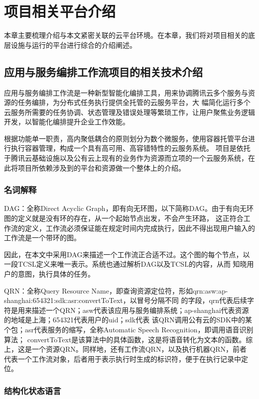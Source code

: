 
\chapter{项目相关平台介绍}
本章主要梳理介绍与本文紧密关联的云平台环境。在本章，我们将对项目相关的底层设施与运行的平台进行综合的介绍阐述。
\cite{ipacfteaom1}
\section{应用与服务编排工作流项目的相关技术介绍}
应用与服务编排工作流是一种新型智能化编排工具，用来协调腾讯云多个服务与资源的任务编排，为分布式任务执行提供全托管的云服务平台，大
幅简化运行多个云服务所需要的任务协调、状态管理及错误处理等繁琐工作，让用户聚焦业务逻辑开发，以智能化编排提升企业工作效能\cite{jydyyybp}。

根据功能单一职责，高内聚低耦合的原则划分为数个微服务，使用容器托管平台进行执行容器管理，构成一个具有高可用、高容错特性的云服务系统。
项目是依托于腾讯云基础设施以及公有云上现有的业务作为资源而立项的一个云服务系统，在此将项目所依赖涉及到的平台和资源做一个整体上的介绍。


\subsection{名词解释}

DAG：全称Direct Acyclic Graph，即有向无环图，以下简称DAG。由于有向无环图的定义就是没有环的存在，从一个起始节点出发，不会产生环路，
这正符合工作流的定义，工作流必须保证能在规定时间内完成执行，因此不得出现用户输入的工作流是一个带环的图。

因此，在本文中采用DAG来描述一个工作流正合适不过。这个图的每个节点，以一段TCSL定义来唯一表示。系统也通过解析DAG以及TCSL的内容，从而
知晓用户的意图，执行具体的任务。

QRN：全称Query Resource Name，即查询资源定位符，形如qrn:asw:ap-shanghai:654321:sdk:asr:convertToText，以冒号分隔不同
的字段，qrn代表后续字符是用来描述一个QRN；asw代表该应用与服务编排系统；ap-shanghai代表资源的地域是上海；654321代表用户的uid；sdk代表
该QRN调用公有云的SDK中的某个包；asr代表服务的缩写，全称Automatic Speech Recognition，即调用语音识别算法；
convertToText是该算法中的具体函数，这是将语音转化为文本的函数。综上，这是一个资源QRN。同样地，还有工作流QRN，以及执行机器QRN，前者
代表一个工作流对象，后者用于表示执行时生成的标识符，便于在执行记录中定位。


\subsection{结构化状态语言}

